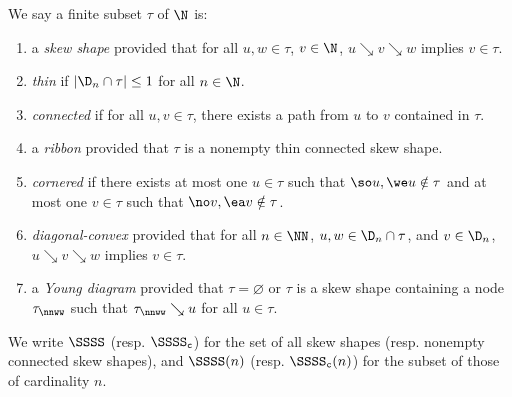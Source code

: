 \begin{defi}\label{skewdef}
We say a finite subset \(\tau\) of \(\N\) is:
\begin{enumerate}
\item a {\em skew shape} provided that for all \(u,w \in \tau\), \(v \in \N\), \(u \searrow v \searrow w\) implies \(v \in \tau\).
\item {\em thin} if \(|\D_n \cap \tau| \leq 1\) for all \(n \in \N\).
\item {\em connected} if for all \(u,v \in \tau\), there exists a path from \(u\) to \(v\) contained in \(\tau\).
\item a {\em ribbon} provided that \(\tau\) is a nonempty thin connected skew shape.
\item {\em cornered} if there exists at most one \(u \in \tau\) such that \(\so u, \we u \notin \tau\) and at most one \(v \in \tau\) such that \(\no v, \ea v \notin \tau\).
\item {\em diagonal-convex} provided that for all \(n \in \NN\), \(u,w \in \D_n \cap \tau\), and \(v \in \D_n\), \(u \searrow v \searrow w\) implies \(v \in \tau\).
\item a {\em Young diagram} provided that \(\tau = \varnothing\) or \(\tau\) is a skew shape containing a node \(\tau_{\nnww}\) such that \(\tau_{\nnww} \searrow u\) for all \(u \in \tau\).
\end{enumerate}
We write \(\SSSS\) (resp. \(\SSSS_{\tt c}\)) for the set of all skew shapes (resp. nonempty connected skew shapes), and \(\SSSS(n)\) (resp. \(\SSSS_{\tt c}(n)\)) for the subset of those of cardinality \(n\).
\end{defi}


